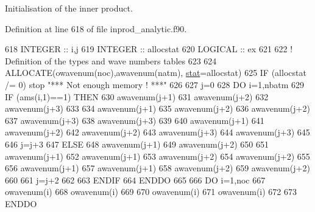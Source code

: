 Initialisation of the inner product. 



Definition at line 618 of file inprod\+\_\+analytic.\+f90.


\begin{DoxyCode}
618     \textcolor{keywordtype}{INTEGER} :: i,j
619     \textcolor{keywordtype}{INTEGER} :: allocstat
620     \textcolor{keywordtype}{LOGICAL} :: ex
621 
622     \textcolor{comment}{! Definition of the types and wave numbers tables}
623 
624     \textcolor{keyword}{ALLOCATE}(owavenum(noc),awavenum(natm), \hyperlink{namespacestat}{stat}=allocstat)
625     \textcolor{keywordflow}{IF} (allocstat /= 0) stop \textcolor{stringliteral}{"*** Not enough memory ! ***"}
626 
627     j=0
628     \textcolor{keywordflow}{DO} i=1,nbatm
629        \textcolor{keywordflow}{IF} (ams(i,1)==1) \textcolor{keywordflow}{THEN}
630           awavenum(j+1)%
631           awavenum(j+2)%
632           awavenum(j+3)%
633 
634           awavenum(j+1)%
635           awavenum(j+2)%
636           awavenum(j+2)%
637           awavenum(j+3)%
638           awavenum(j+3)%
639 
640           awavenum(j+1)%
641           awavenum(j+2)%
642           awavenum(j+2)%
643           awavenum(j+3)%
644           awavenum(j+3)%
645 
646           j=j+3
647        \textcolor{keywordflow}{ELSE}
648           awavenum(j+1)%
649           awavenum(j+2)%
650 
651           awavenum(j+1)%
652           awavenum(j+1)%
653           awavenum(j+2)%
654           awavenum(j+2)%
655 
656           awavenum(j+1)%
657           awavenum(j+1)%
658           awavenum(j+2)%
659           awavenum(j+2)%
660 
661           j=j+2
662 
663 \textcolor{keywordflow}{       ENDIF}
664 \textcolor{keywordflow}{    ENDDO}
665 
666     \textcolor{keywordflow}{DO} i=1,noc
667        owavenum(i)%
668        owavenum(i)%
669 
670        owavenum(i)%
671        owavenum(i)%
672 
673 \textcolor{keywordflow}{    ENDDO}

\end{DoxyCode}

